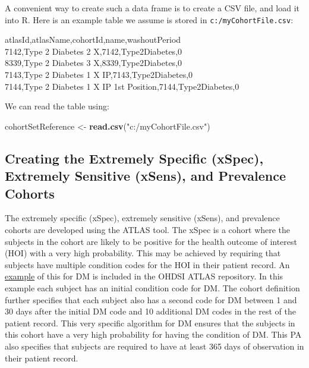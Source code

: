 \documentclass[
]{article}
\newenvironment{Shaded}{\begin{snugshade}}{\end{snugshade}}
\newcommand{\KeywordTok}[1]{\textcolor[rgb]{0.13,0.29,0.53}{\textbf{#1}}}
\newcommand{\NormalTok}[1]{#1}
\newcommand{\StringTok}[1]{\textcolor[rgb]{0.31,0.60,0.02}{#1}}
\begin{document}
A convenient way to create such a data frame is to create a CSV file,
and load it into R. Here is an example table we assume is stored in
\texttt{c:/myCohortFile.csv}:

atlasId,atlasName,cohortId,name,washoutPeriod\\
7142,Type 2 Diabetes 2 X,7142,Type2Diabetes,0\\
8339,Type 2 Diabetes 3 X,8339,Type2Diabetes,0\\
7143,Type 2 Diabetes 1 X IP,7143,Type2Diabetes,0\\
7144,Type 2 Diabetes 1 X IP 1st Position,7144,Type2Diabetes,0

We can read the table using:

\begin{Shaded}
\begin{Highlighting}[]
\NormalTok{cohortSetReference <-}\StringTok{ }\KeywordTok{read.csv}\NormalTok{(}\StringTok{"c:/myCohortFile.csv"}\NormalTok{)}
\end{Highlighting}
\end{Shaded}

\hypertarget{creating-the-extremely-specific-xspec-extremely-sensitive-xsens-and-prevalence-cohorts}{%
\subsection{Creating the Extremely Specific (xSpec), Extremely Sensitive
(xSens), and Prevalence
Cohorts}\label{creating-the-extremely-specific-xspec-extremely-sensitive-xsens-and-prevalence-cohorts}}

The extremely specific (xSpec), extremely sensitive (xSens), and
prevalence cohorts are developed using the ATLAS tool. The xSpec is a
cohort where the subjects in the cohort are likely to be positive for
the health outcome of interest (HOI) with a very high probability. This
may be achieved by requiring that subjects have multiple condition codes
for the HOI in their patient record. An
\href{http://www.ohdsi.org/web/atlas/\#/cohortdefinition/1769699}{example}
of this for DM is included in the OHDSI ATLAS repository. In this
example each subject has an initial condition code for DM. The cohort
definition further specifies that each subject also has a second code
for DM between 1 and 30 days after the initial DM code and 10 additional
DM codes in the rest of the patient record. This very specific algorithm
for DM ensures that the subjects in this cohort have a very high
probability for having the condition of DM. This PA also specifies that
subjects are required to have at least 365 days of observation in their
patient record.
\end{document}
